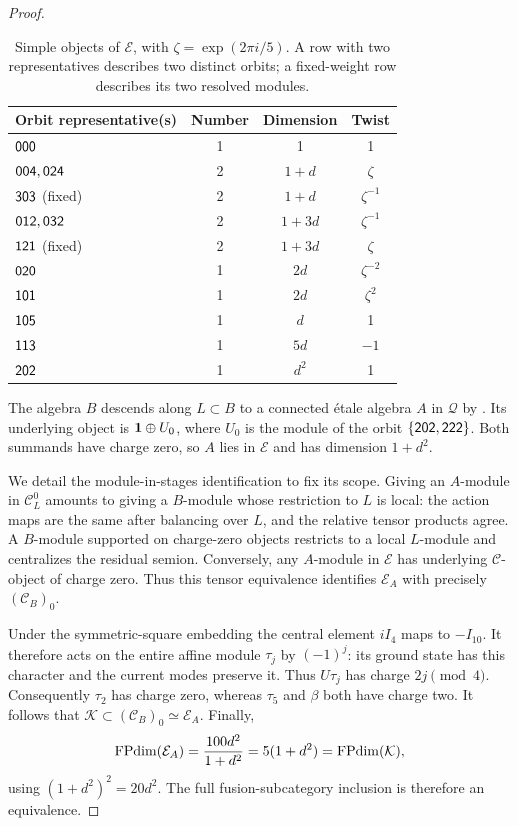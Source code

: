 \begin{proof}
\begin{table}[ht]
\centering
\caption{Simple objects of $\mathcal{E}$, with $\zeta=\exp(2\pi i/5)$. A row
with two representatives describes two distinct orbits; a fixed-weight
row describes its two resolved modules.}
\label{r189-tab:fourteen}
\begin{tabular}{@{}lccc@{}}
\toprule
Orbit representative(s)&Number&Dimension&Twist\\
\midrule
$\mathsf{000}$&1&1&1\\
$\mathsf{004},\mathsf{024}$&2&$1+d$&$\zeta$\\
$\mathsf{303}$ (fixed)&2&$1+d$&$\zeta^{-1}$\\
$\mathsf{012},\mathsf{032}$&2&$1+3d$&$\zeta^{-1}$\\
$\mathsf{121}$ (fixed)&2&$1+3d$&$\zeta$\\
$\mathsf{020}$&1&$2d$&$\zeta^{-2}$\\
$\mathsf{101}$&1&$2d$&$\zeta^2$\\
$\mathsf{105}$&1&$d$&1\\
$\mathsf{113}$&1&$5d$&$-1$\\
$\mathsf{202}$&1&$d^2$&1\\
\bottomrule
\end{tabular}
\end{table}

The algebra $B$ descends along $L\subset B$ to a connected \'etale
algebra $A$ in $\mathcal{Q}$ by \cite[Proposition~3.16]{DMNO}. Its underlying
object is $\mathbf1\oplus U_0$, where $U_0$ is the module of the orbit
$\{\mathsf{202},\mathsf{222}\}$. Both summands have charge zero, so $A$ lies
in $\mathcal{E}$ and has dimension $1+d^2$.

We detail the module-in-stages identification to fix its scope. Giving
an $A$-module in $\mathcal{C}_L^0$ amounts to giving a $B$-module whose restriction
to $L$ is local: the action maps are the same after balancing over $L$,
and the relative tensor products agree. A $B$-module supported on
charge-zero objects restricts to a local $L$-module and centralizes
the residual semion. Conversely, any $A$-module in $\mathcal{E}$ has underlying
$\mathcal{C}$-object of charge zero. Thus this tensor equivalence identifies
$\mathcal{E}_A$ with precisely $(\mathcal{C}_B)_0$.

Under the symmetric-square embedding the central element $iI_4$ maps
to $-I_{10}$. It therefore acts on the entire affine module $\tau_j$
by $(-1)^j$: its ground state has this character and the current modes
preserve it. Thus $U\tau_j$ has charge $2j\pmod4$.
Consequently $\tau_2$ has charge zero, whereas
$\tau_5$ and $\beta$ both have charge two. It follows that
$\mathcal{K}\subset(\mathcal{C}_B)_0\simeq\mathcal{E}_A$. Finally,
\[
 \operatorname{FPdim}(\mathcal{E}_A)=\frac{100d^2}{1+d^2}=5(1+d^2)=\operatorname{FPdim}(\mathcal{K}),
\]
using $(1+d^2)^2=20d^2$. The full fusion-subcategory inclusion is
therefore an equivalence.
\end{proof}

